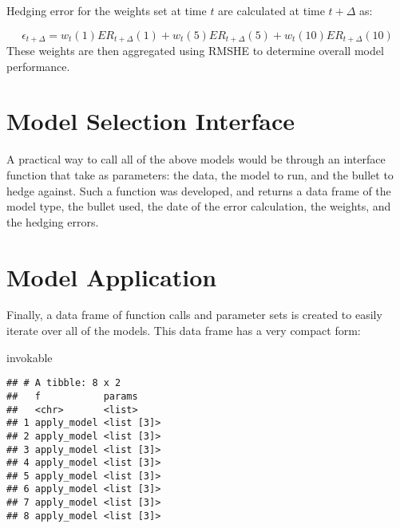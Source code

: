 \documentclass[openany]{book}
\newenvironment{Shaded}{\begin{snugshade}}{\end{snugshade}}
\newcommand{\NormalTok}[1]{#1}
\theoremstyle{definition}
\theoremstyle{definition}
\theoremstyle{definition}
\theoremstyle{remark}
\begin{document}
Hedging error for the weights set at time \(t\) are calculated at time
\(t+\Delta\) as:

\[ \epsilon_{t+\Delta} = w_t(1) ER_{t+\Delta}(1) + w_t(5) ER_{t+\Delta}(5) + w_t(10) ER_{t+\Delta}(10) \]
These weights are then aggregated using RMSHE to determine overall model
performance.

\small

\normalsize

\hypertarget{model-selection-interface}{%
\section{Model Selection Interface}\label{model-selection-interface}}

A practical way to call all of the above models would be through an
interface function that take as parameters: the data, the model to run,
and the bullet to hedge against. Such a function was developed, and
returns a data frame of the model type, the bullet used, the date of the
error calculation, the weights, and the hedging errors.

\small

\normalsize

\small

\normalsize

\small

\normalsize

\small

\normalsize

\hypertarget{model-application}{%
\section{Model Application}\label{model-application}}

\small

\normalsize

Finally, a data frame of function calls and parameter sets is created to
easily iterate over all of the models. This data frame has a very
compact form:

\small

\begin{Shaded}
\begin{Highlighting}[]
\NormalTok{invokable}
\end{Highlighting}
\end{Shaded}

\begin{verbatim}
## # A tibble: 8 x 2
##   f           params    
##   <chr>       <list>    
## 1 apply_model <list [3]>
## 2 apply_model <list [3]>
## 3 apply_model <list [3]>
## 4 apply_model <list [3]>
## 5 apply_model <list [3]>
## 6 apply_model <list [3]>
## 7 apply_model <list [3]>
## 8 apply_model <list [3]>
\end{verbatim}
\end{document}
